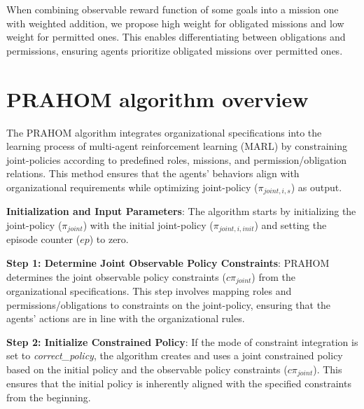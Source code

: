 \documentclass[conference]{IEEEtran}
\newcounter{relation}
\begin{document}
When combining observable reward function of some goals into a mission one with weighted addition, we propose high weight for obligated missions and low weight for permitted ones. This enables differentiating between obligations and permissions, ensuring agents prioritize obligated missions over permitted ones.

\section{PRAHOM algorithm overview}\label{sec:prahom_theory}



The PRAHOM algorithm integrates organizational specifications into the learning process of multi-agent reinforcement learning (MARL) by constraining joint-policies according to predefined roles, missions, and permission/obligation relations. This method ensures that the agents' behaviors align with organizational requirements while optimizing joint-policy ($\pi_{joint,i,s}$) as output.

\textbf{Initialization and Input Parameters}: \quad
The algorithm starts by initializing the joint-policy ($\pi_{joint}$) with the initial joint-policy ($\pi_{joint,i,init}$) and setting the episode counter ($ep$) to zero.

\textbf{Step 1: Determine Joint Observable Policy Constraints}: \quad
PRAHOM determines the joint observable policy constraints ($c\pi_{joint}$) from the organizational specifications. This step involves mapping roles and permissions/obligations to constraints on the joint-policy, ensuring that the agents' actions are in line with the organizational rules.

\textbf{Step 2: Initialize Constrained Policy}: \quad
If the mode of constraint integration is set to \textit{correct\_policy}, the algorithm creates and uses a joint constrained policy based on the initial policy and the observable policy constraints ($c\pi_{joint}$). This ensures that the initial policy is inherently aligned with the specified constraints from the beginning.
\end{document}
